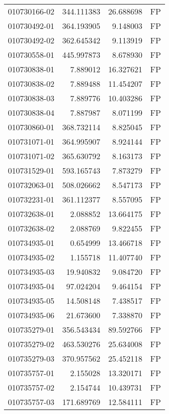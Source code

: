 \begin{tabular}{lrrl}
010730166-02 &  344.111383 &      26.688698 &   FP \\
010730492-01 &  364.193905 &       9.148003 &   FP \\
010730492-02 &  362.645342 &       9.113919 &   FP \\
010730558-01 &  445.997873 &       8.678930 &   FP \\
010730838-01 &    7.889012 &      16.327621 &   FP \\
010730838-02 &    7.889488 &      11.454207 &   FP \\
010730838-03 &    7.889776 &      10.403286 &   FP \\
010730838-04 &    7.887987 &       8.071199 &   FP \\
010730860-01 &  368.732114 &       8.825045 &   FP \\
010731071-01 &  364.995907 &       8.924144 &   FP \\
010731071-02 &  365.630792 &       8.163173 &   FP \\
010731529-01 &  593.165743 &       7.873279 &   FP \\
010732063-01 &  508.026662 &       8.547173 &   FP \\
010732231-01 &  361.112377 &       8.557095 &   FP \\
010732638-01 &    2.088852 &      13.664175 &   FP \\
010732638-02 &    2.088769 &       9.822455 &   FP \\
010734935-01 &    0.654999 &      13.466718 &   FP \\
010734935-02 &    1.155718 &      11.407740 &   FP \\
010734935-03 &   19.940832 &       9.084720 &   FP \\
010734935-04 &   97.024204 &       9.464154 &   FP \\
010734935-05 &   14.508148 &       7.438517 &   FP \\
010734935-06 &   21.673600 &       7.338870 &   FP \\
010735279-01 &  356.543434 &      89.592766 &   FP \\
010735279-02 &  463.530276 &      25.634008 &   FP \\
010735279-03 &  370.957562 &      25.452118 &   FP \\
010735757-01 &    2.155028 &      13.320171 &   FP \\
010735757-02 &    2.154744 &      10.439731 &   FP \\
010735757-03 &  171.689769 &      12.584111 &   FP \\

\end{tabular}
